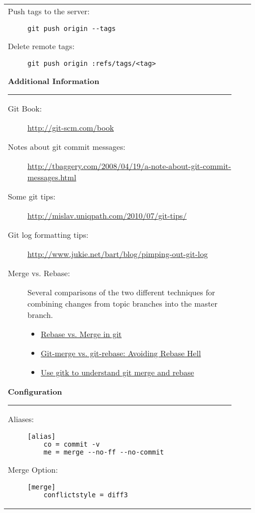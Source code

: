 \documentclass[landscape]{article}
\begin{document}
\begin{tabular*}{10.5in}{|p{2.9in}|p{2.9in}|p{2.9in}|}
\begin{flushleft}
\begin{description}
            \item[Push tags to the server:]
                {\verb!git push origin --tags!}
            \item[Delete remote tags:]
                {\verb!git push origin :refs/tags/<tag>!}
        \end{description}
        \textbf{\large{Additional Information}}
        \rule{2.9in}{.5pt}
        \small
        \begin{description}
            \item[Git Book:]{\url{http://git-scm.com/book}}
            \item[Notes about git commit messages:]
                {\url{http://tbaggery.com/2008/04/19/a-note-about-git-commit-messages.html}}
            \item[Some git tips:]
                {\url{http://mislav.uniqpath.com/2010/07/git-tips/}}
            \item[Git log formatting tips:]
                {\url{http://www.jukie.net/bart/blog/pimping-out-git-log}}
            \item[Merge vs. Rebase:]
                {Several comparisons of the two different techniques for
                combining changes from topic branches into the master branch.}
                \begin{itemize}
                    \item{\href{http://gitguru.com/2009/02/03/rebase-v-merge-in-git/}
                          {Rebase vs. Merge in git}}
                    \item{\href{http://www.jarrodspillers.com/2009/08/19/git-merge-vs-git-rebase-avoiding-rebase-hell/}
                          {Git-merge vs. git-rebase: Avoiding Rebase Hell}}
                    \item{\href{http://lostechies.com/joshuaflanagan/2010/09/03/use-gitk-to-understand-git-merge-and-rebase/}
                          {Use gitk to understand git merge and rebase}}
                \end{itemize}
        \end{description}
        \textbf{\large{Configuration}}
        \rule{2.9in}{.5pt}
        \small
        \begin{description}
            \item[Aliases:]
                {\begin{verbatim}
[alias]
    co = commit -v
    me = merge --no-ff --no-commit\end{verbatim}}
            \item[Merge Option:]
                {\begin{verbatim}
[merge]
	conflictstyle = diff3\end{verbatim}}
        \end{description}
    \end{flushleft}
\end{tabular*}
\end{document}

